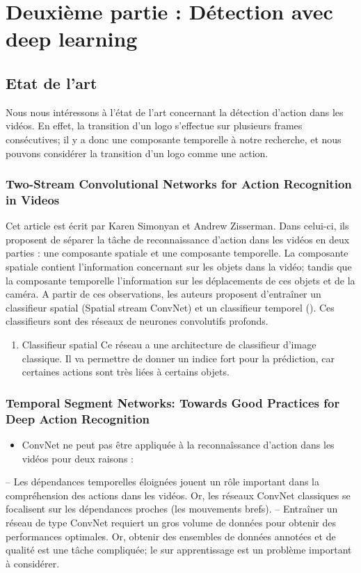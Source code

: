 \documentclass[11pt]{article}
\begin{document}
\section{Deuxième partie : Détection avec deep learning}
\label{sec-8}

\subsection{Etat de l'art}
\label{sec-8-1}
Nous nous intéressons à l'état de l'art concernant la détection d'action
dans les vidéos. En effet, la transition d'un logo s'effectue sur plusieurs 
frames consécutives; il y a donc une composante temporelle à notre recherche,
et nous pouvons considérer la transition d'un logo comme une action.
\subsubsection{Two-Stream Convolutional Networks for Action Recognition in Videos}
\label{sec-8-1-1}
Cet article est écrit par Karen Simonyan et Andrew Zisserman. Dans celui-ci,
ils proposent de séparer la tâche de reconnaissance d'action dans les vidéos en 
deux parties : une composante spatiale et une composante temporelle.
La composante spatiale contient l'information concernant sur les objets dans
la vidéo; tandis que la composante temporelle l'information sur les 
déplacements de ces objets et de la caméra. 
A partir de ces observations, les auteurs proposent d'entraîner un classifieur
spatial (Spatial stream ConvNet) et un classifieur temporel (). Ces classifieurs
sont des réseaux de neurones convolutifs profonds. 

\begin{enumerate}
\item Classifieur spatial
\label{sec-8-1-1-1}
Ce réseau a une architecture de classifieur d'image classique. Il va permettre
de donner un indice fort pour la prédiction, car certaines actions sont très 
liées à certains objets.
\end{enumerate}


\subsubsection{Temporal Segment Networks: Towards Good Practices for Deep Action Recognition}
\label{sec-8-1-2}
\begin{itemize}
\item ConvNet ne peut pas être appliquée à la reconnaîssance d'action dans les vidéos pour deux raisons :
\end{itemize}
-- Les dépendances temporelles éloignées jouent un rôle important dans la compréhension des actions dans les vidéos.
Or, les réseaux ConvNet classiques se focalisent sur les dépendances proches (les mouvements brefs).
-- Entraîner un réseau de type ConvNet requiert un gros volume de données pour obtenir des performances optimales.
Or, obtenir des ensembles de données annotées et de qualité est une tâche compliquée; le sur apprentissage est un
problème important à considérer.
\end{document}

